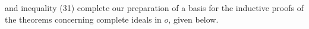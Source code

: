and inequality (31) complete our preparation of a basis for the inductive proofs of the theorems concerning complete ideals in $o$, given below.